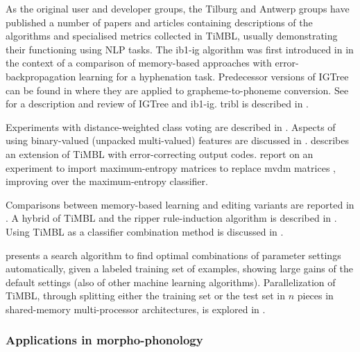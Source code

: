 \documentclass{book}
\begin{document}
As the original user and developer groups, the Tilburg and Antwerp
groups have published a number of papers and articles containing
descriptions of the algorithms and specialised metrics collected in
TiMBL, usually demonstrating their functioning using NLP tasks. The
{\sc ib1-ig} algorithm was first introduced in \cite{Daelemans+92b} in
the context of a comparison of memory-based approaches with
error-back\-propagation learning for a hyphenation task.  Predecessor
versions of {\sc IGTree} can be found in
\cite{Daelemans+93c,VandenBosch+93} where they are applied to
grapheme-to-phoneme conversion.  See \cite{Daelemans+97} for a
description and review of {\sc IGTree} and {\sc ib1-ig}. {\sc tribl}
is described in \cite{Daelemans+97d}.

Experiments with distance-weighted class voting are described in
\cite{Zavrel97}. Aspects of using binary-valued (unpacked
multi-valued) features are discussed in
\cite{VandenBosch+00}.  describes an extension
of TiMBL with error-correcting output codes. 
report on an experiment to import maximum-entropy matrices to replace
{\sc mvdm} matrices \cite{Hendrickx+04}, improving over the
maximum-entropy classifier.

Comparisons between memory-based learning and editing variants are
reported in \cite{VandenBosch99,Daelemans+99}. A hybrid of TiMBL and
the {\sc ripper} rule-induction algorithm \cite{Cohen95} is described
in \cite{VandenBosch00,VandenBosch04}. Using TiMBL as a classifier
combination method is discussed in
\cite{Halteren+01}.

 presents a search algorithm to
find optimal combinations of parameter settings automatically, given a
labeled training set of examples, showing large gains of the default
settings (also of other machine learning algorithms). Parallelization
of TiMBL, through splitting either the training set or the test set in
$n$ pieces in shared-memory multi-processor architectures, is explored
in \cite{VandenBosch+07b}.

\subsubsection{Applications in morpho-phonology}
\end{document}
